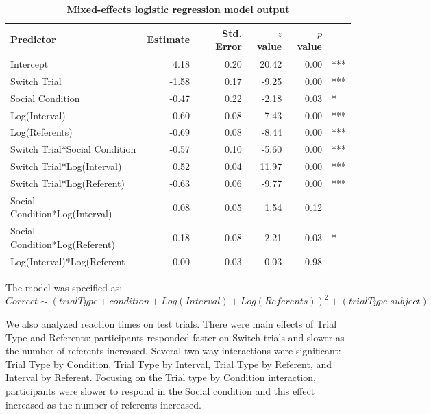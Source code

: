 \documentclass[man]{apa2}
\begin{document}
\begin{table}[H]
\centering
\caption{\textbf{Mixed-effects logistic regression model output}}
\begin{tabular}{lrrrrl}
 Predictor & Estimate & Std. Error & $z$ value & $p$ value &  \\ 
  \hline
Intercept & 4.18 & 0.20 & 20.42 & 0.00 & *** \\ 
  Switch Trial & -1.58 & 0.17 & -9.25 & 0.00 & *** \\ 
  Social Condition & -0.47 & 0.22 & -2.18 & 0.03 & * \\ 
  Log(Interval) & -0.60 & 0.08 & -7.43 & 0.00 & *** \\ 
  Log(Referents) & -0.69 & 0.08 & -8.44 & 0.00 & *** \\ 
  Switch Trial*Social Condition & -0.57 & 0.10 & -5.60 & 0.00 & *** \\ 
  Switch Trial*Log(Interval) & 0.52 & 0.04 & 11.97 & 0.00 & *** \\ 
  Switch Trial*Log(Referent) & -0.63 & 0.06 & -9.77 & 0.00 & *** \\ 
  Social Condition*Log(Interval) & 0.08 & 0.05 & 1.54 & 0.12 &  \\ 
  Social Condition*Log(Referent) & 0.18 & 0.08 & 2.21 & 0.03 & * \\ 
  Log(Interval)*Log(Referent & 0.00 & 0.03 & 0.03 & 0.98 &  \\ 
   \hline
\end{tabular}
\raggedright

The model was specified as: $Correct \sim (trialType + condition + Log(Interval) + Log(Referents))^2 + (trialType | subject)$
\end{table}

We also analyzed reaction times on test trials. There were main effects of Trial Type and Referents: participants responded faster on Switch trials and slower as the number of referents increased. Several two-way interactions were significant: Trial Type by Condition, Trial Type by Interval, Trial Type by Referent, and Interval by Referent. Focusing on the Trial type by Condition interaction, participants were slower to respond in the Social condition and this effect increased as the number of referents increased.    
\end{document}
